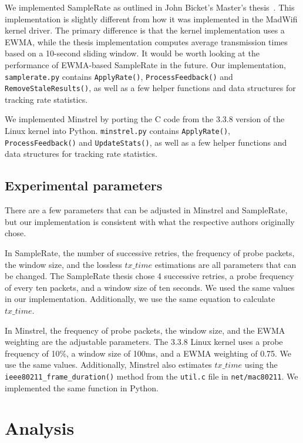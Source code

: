 \documentclass[twocolumn,10pt]{article}
\begin{document}
We implemented SampleRate as outlined in John Bicket's Master's
thesis~\cite{samplerate}.  This implementation is slightly different
from how it was implemented in the MadWifi kernel driver.  The primary
difference is that the kernel implementation uses a EWMA, while the
thesis implementation computes average transmission times based on a
10-second sliding window.  It would be worth looking at the
performance of EWMA-based SampleRate in the future.  Our
implementation, \texttt{samplerate.py} contains \texttt{ApplyRate()},
\texttt{ProcessFeedback()} and \texttt{RemoveStaleResults()}, as well
as a few helper functions and data structures for tracking rate
statistics.

We implemented Minstrel by porting the C code from the 3.3.8 version
of the Linux kernel into Python.  \texttt{minstrel.py} contains
\texttt{ApplyRate()}, \texttt{ProcessFeedback()} and
\texttt{UpdateStats()}, as well as a few helper functions and data
structures for tracking rate statistics.

\subsection{Experimental parameters}

There are a few parameters that can be adjusted in Minstrel and
SampleRate, but our implementation is consistent with what the
respective authors originally chose.

In SampleRate, the number of successive retries, the frequency of
probe packets, the window size, and the lossless $tx\_time$
estimations are all parameters that can be changed.  The SampleRate
thesis chose 4 successive retries, a probe frequency of every ten
packets, and a window size of ten seconds.  We used the same values in
our implementation.  Additionally, we use the same equation to
calculate $tx\_time$.

In Minstrel, the frequency of probe packets, the window size, and the
EWMA weighting are the adjustable parameters.  The 3.3.8 Linux kernel
uses a probe frequency of 10\%, a window size of 100ms, and a EWMA
weighting of 0.75.  We use the same values.  Additionally, Minstrel
also estimates $tx\_time$ using the \verb|ieee80211_frame_duration()|
method from the \texttt{util.c} file in \texttt{net/mac80211}.  We
implemented the same function in Python.


\section{Analysis} \label{sec:analysis}
\end{document}
